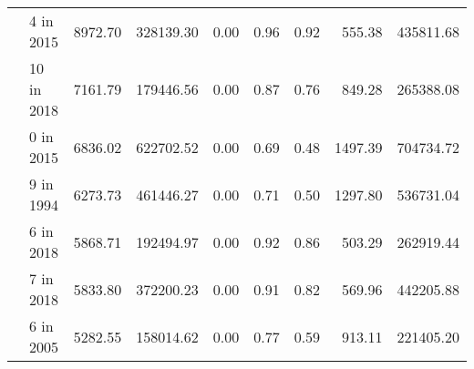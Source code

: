 \begin{tabular}{llrrrrrrr}
   & 4 in 2015 &                                     8972.70 &                                       328139.30 &                                          0.00 &                                               0.96 &                                        0.92 &                                             555.38 &                                        435811.68 \\
   & 10 in 2018 &                                     7161.79 &                                       179446.56 &                                          0.00 &                                               0.87 &                                        0.76 &                                             849.28 &                                        265388.08 \\
   & 0 in 2015 &                                     6836.02 &                                       622702.52 &                                          0.00 &                                               0.69 &                                        0.48 &                                            1497.39 &                                        704734.72 \\
   & 9 in 1994 &                                     6273.73 &                                       461446.27 &                                          0.00 &                                               0.71 &                                        0.50 &                                            1297.80 &                                        536731.04 \\
   & 6 in 2018 &                                     5868.71 &                                       192494.97 &                                          0.00 &                                               0.92 &                                        0.86 &                                             503.29 &                                        262919.44 \\
   & 7 in 2018 &                                     5833.80 &                                       372200.23 &                                          0.00 &                                               0.91 &                                        0.82 &                                             569.96 &                                        442205.88 \\
   & 6 in 2005 &                                     5282.55 &                                       158014.62 &                                          0.00 &                                               0.77 &                                        0.59 &                                             913.11 &                                        221405.20 \\

\end{tabular}

